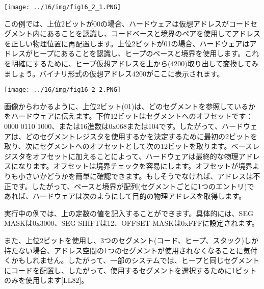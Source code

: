 \texttt{[image: ../16/img/fig16\_2\_1.PNG]}

この例では、上位2ビットが00の場合、ハードウェアは仮想アドレスがコードセグメント内にあることを認識し、コードベースと境界のペアを使用してアドレスを正しい物理位置に再配置します。上位2ビットが01の場合、ハードウェアはアドレスがヒープにあることを認識し、ヒープのベースと境界を使用します。これを明確にするために、ヒープ仮想アドレスを上から(4200)取り出して変換してみましょう。バイナリ形式の仮想アドレス4200がここに表示されます。

\texttt{[image: ../16/img/fig16\_2\_2.PNG]}

画像からわかるように、上位2ビット(01)は、どのセグメントを参照しているかをハードウェアに伝えます。下位12ビットはセグメントへのオフセットです：0000
0110
1000、または16進数は0x068または104です。したがって、ハードウェアは、どのセグメントレジスタを使用するかを決定するために最初の2ビットを取り、次にセグメントへのオフセットとして次の12ビットを取ります。ベースレジスタをオフセットに加えることによって、ハードウェアは最終的な物理アドレスになります。オフセットは境界チェックを容易にします。オフセットが境界よりも小さいかどうかを簡単に確認できます。もしそうでなければ、アドレスは不正です。したがって、ベースと境界が配列(セグメントごとに1つのエントリ)であれば、ハードウェアは次のようにして目的の物理アドレスを取得します。

\begin{Shaded}
\begin{Highlighting}[]
\end{Highlighting}
\end{Shaded}

実行中の例では、上の定数の値を記入することができます。具体的には、SEG
MASKは0x3000、SEG SHIFTは12、OFFSET MASKは0xFFFに設定されます。

また、上位2ビットを使用し、3つのセグメント(コード、ヒープ、スタック)しか持たない場合、アドレス空間の1つのセグメントが使用されなくなることに気付くかもしれません。したがって、一部のシステムでは、ヒープと同じセグメントにコードを配置し、したがって、使用するセグメントを選択するために1ビットのみを使用します{[}LL82{]}。

